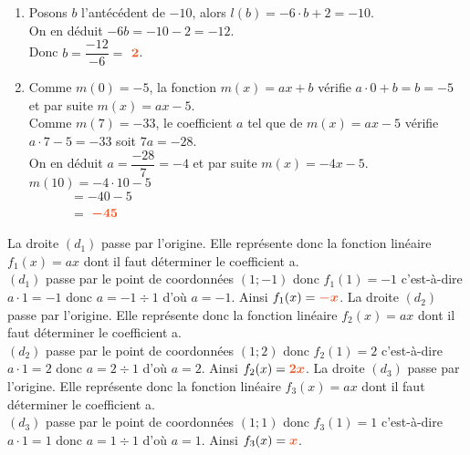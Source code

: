 \documentclass[a4paper,12pt]{report}
\begin{document}
\begin{Correction}
\begin{EXO}{}{}
\begin{enumerate}[itemsep=3em]
\item Posons $b$ l'antécédent de $-10$, alors $l(b)=-6\cdot b+2=-10$.\\On en déduit $-6b=-10-2=-12$.\\Donc $b=\dfrac{-12}{-6}=$ ${\color[HTML]{f15929}\boldsymbol{2}}$.
\item Comme $m(0)=-5$, la fonction $m(x)=ax+b$ vérifie $a\cdot 0 + b = b = -5$ et par suite $m(x)=ax-5$.\\Comme $m(7)=-33$, le coefficient $a$ tel que de $m(x)=ax-5$ vérifie $a\cdot 7-5 = -33$ soit $7a=-28$.\\On en déduit $a=\dfrac{-28}{7}=-4$ et par suite $m(x)=-4x-5$.\\$m(10)=-4 \cdot 10-5$\\$\phantom{f(10)}=-40-5$\\$\phantom{f(10)}=$ ${\color[HTML]{f15929}\boldsymbol{-45}}$
\end{enumerate}

\end{EXO}

\begin{EXO}{}{}

 La droite $(d_1)$ passe par l'origine. Elle représente donc la fonction linéaire $f_1(x)=ax$ dont il faut déterminer le coefficient a.\\$(d_1)$ passe par le point de coordonnées $(1;-1)$ donc $f_1(1)=-1$ c'est-à-dire $a\cdot 1=-1$ donc $a=-1\div 1$ d'où $a=-1$. Ainsi $f_1(x)={\color[HTML]{f15929}\boldsymbol{-x}}$.
 La droite $(d_2)$ passe par l'origine. Elle représente donc la fonction linéaire $f_2(x)=ax$ dont il faut déterminer le coefficient a.\\$(d_2)$ passe par le point de coordonnées $(1;2)$ donc $f_2(1)=2$ c'est-à-dire $a\cdot 1=2$ donc $a=2\div 1$ d'où $a=2$. Ainsi $f_2(x)={\color[HTML]{f15929}\boldsymbol{2x}}$.
 La droite $(d_3)$ passe par l'origine. Elle représente donc la fonction linéaire $f_3(x)=ax$ dont il faut déterminer le coefficient a.\\$(d_3)$ passe par le point de coordonnées $(1;1)$ donc $f_3(1)=1$ c'est-à-dire $a\cdot 1=1$ donc $a=1\div 1$ d'où $a=1$. Ainsi $f_3(x)={\color[HTML]{f15929}\boldsymbol{x}}$.
\end{EXO}

\begin{EXO}{}{}


\end{EXO}
\end{Correction}
\end{document}

